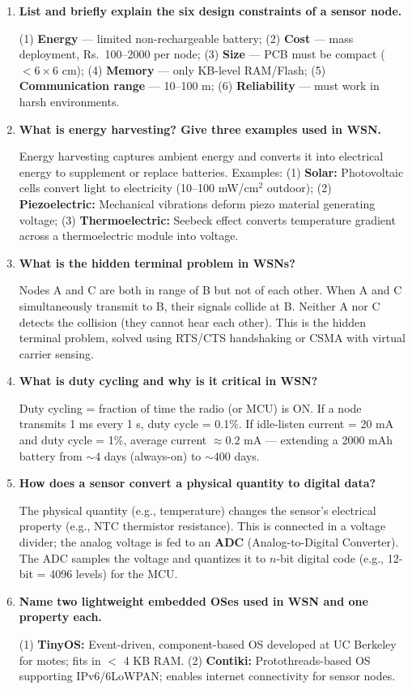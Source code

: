 \documentclass[12pt,a4paper]{article}
\newcommand{\Q}[1]{\textbf{#1}\par\noindent\ignorespaces}
\begin{document}
\begin{tcolorbox}[exambox, title={\textbf{Frequently Asked / Viva Questions}}]
\begin{enumerate}[topsep=0pt, label=\textbf{Q\arabic*.}, itemsep=5pt]
  \item \Q{List and briefly explain the six design constraints of a sensor node.}
  (1) \textbf{Energy} --- limited non-rechargeable battery; (2) \textbf{Cost} --- mass deployment, Rs.~100--2000 per node; (3) \textbf{Size} --- PCB must be compact ($< 6 \times 6$ cm); (4) \textbf{Memory} --- only KB-level RAM/Flash; (5) \textbf{Communication range} --- 10--100 m; (6) \textbf{Reliability} --- must work in harsh environments.

  \item \Q{What is energy harvesting? Give three examples used in WSN.}
  Energy harvesting captures ambient energy and converts it into electrical energy to supplement or replace batteries. Examples: (1) \textbf{Solar:} Photovoltaic cells convert light to electricity (10--100 mW/cm$^2$ outdoor); (2) \textbf{Piezoelectric:} Mechanical vibrations deform piezo material generating voltage; (3) \textbf{Thermoelectric:} Seebeck effect converts temperature gradient across a thermoelectric module into voltage.

  \item \Q{What is the hidden terminal problem in WSNs?}
  Nodes A and C are both in range of B but not of each other. When A and C simultaneously transmit to B, their signals collide at B. Neither A nor C detects the collision (they cannot hear each other). This is the hidden terminal problem, solved using RTS/CTS handshaking or CSMA with virtual carrier sensing.

  \item \Q{What is duty cycling and why is it critical in WSN?}
  Duty cycling = fraction of time the radio (or MCU) is ON. If a node transmits 1 ms every 1 s, duty cycle = 0.1\%. If idle-listen current = 20 mA and duty cycle = 1\%, average current $\approx 0.2$ mA --- extending a 2000 mAh battery from $\sim$4 days (always-on) to $\sim$400 days.

  \item \Q{How does a sensor convert a physical quantity to digital data?}
  The physical quantity (e.g., temperature) changes the sensor's electrical property (e.g., NTC thermistor resistance). This is connected in a voltage divider; the analog voltage is fed to an \textbf{ADC} (Analog-to-Digital Converter). The ADC samples the voltage and quantizes it to $n$-bit digital code (e.g., 12-bit = 4096 levels) for the MCU.

  \item \Q{Name two lightweight embedded OSes used in WSN and one property each.}
  (1) \textbf{TinyOS:} Event-driven, component-based OS developed at UC Berkeley for motes; fits in $<$ 4 KB RAM. (2) \textbf{Contiki:} Protothreads-based OS supporting IPv6/6LoWPAN; enables internet connectivity for sensor nodes.


\end{enumerate}
\end{tcolorbox}
\end{document}
